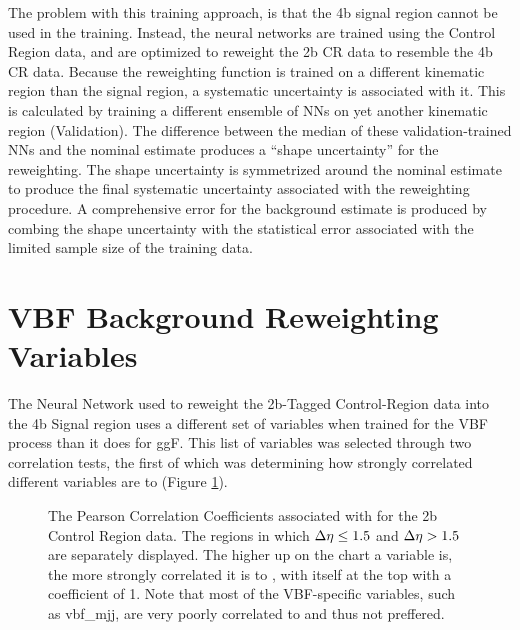     The problem with this training approach, is that the 4b signal region cannot be used in the training.
    Instead, the neural networks are trained using the Control Region data,
        and are optimized to reweight the 2b CR data to resemble the 4b CR data.
    Because the reweighting function is trained on a different kinematic region than the signal region,
        a systematic uncertainty is associated with it.
    This is calculated by training a different ensemble of NNs on yet another kinematic region (Validation).
    The difference between the median of these validation-trained NNs and the nominal estimate
        produces a ``shape uncertainty'' for the reweighting.
    The shape uncertainty is symmetrized around the nominal estimate to produce the final systematic uncertainty
        associated with the reweighting procedure.
    A comprehensive error for the background estimate is produced by combing the shape uncertainty with the statistical error
        associated with the limited sample size of the training data.


\section{VBF Background Reweighting Variables} \label{sec:vbf_bgdNNRW}

    The Neural Network used to reweight the 2b-Tagged Control-Region data into the 4b Signal region
        uses a different set of variables when trained for the VBF process than it does for ggF.
    This list of variables was selected through two correlation tests,
        the first of which was determining how strongly correlated different variables are to \mhh
        (Figure \ref{fig:mhh_corr}).

    \begin{figure}[!htbp]
        \caption{
            The Pearson Correlation Coefficients associated with \mhh for the 2b Control Region data.
            The regions in which $\Delta \eta \leq 1.5$ and $\Delta \eta>1.5$ are separately displayed.
            The higher up on the chart a variable is, the more strongly correlated it is to \mhh,
                with \mhh itself at the top with a coefficient of 1.
            Note that most of the VBF-specific variables, such as vbf\_mjj, are very poorly correlated to \mhh and thus not preffered.
        }
        \label{fig:mhh_corr}
    \end{figure}

